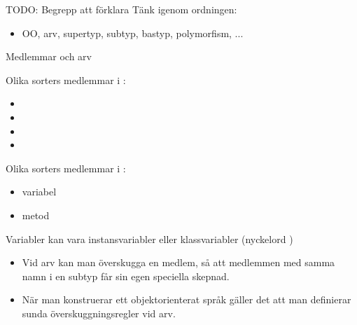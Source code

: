 


\begin{Slide}{TODO: Begrepp att förklara}
  Tänk igenom ordningen:
  \begin{itemize}
    \item OO, arv, supertyp, subtyp, bastyp, polymorfism, ... 
  \end{itemize}
\end{Slide}


\begin{Slide}{Medlemmar och arv}\footnotesize
\begin{multicols}{2}
Olika sorters medlemmar i :
\begin{itemize}
\item {}
\item {}
\item {}
\item {}

\end{itemize}

\columnbreak

Olika sorters medlemmar i :
\begin{itemize}
\item variabel 
\item metod
\end{itemize}

\vspace{1em}

Variabler kan vara instansvariabler eller klassvariabler (nyckelord )

\end{multicols}

\pause
\begin{itemize}
\item Vid arv kan man överskugga  en medlem, så att medlemmen med samma namn i en subtyp får sin egen speciella skepnad.

\item När man konstruerar ett objektorienterat språk gäller det att man definierar sunda överskuggningsregler vid arv.
\end{itemize}
\end{Slide}


